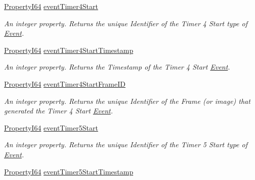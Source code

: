 \begin{DoxyCompactItemize}
\hyperlink{group___common_interface_ga81749b2696755513663492664a18a893}{Property\+I64} \hyperlink{classmv_i_m_p_a_c_t_1_1acquire_1_1_gen_i_cam_1_1_event_control_a8413023934f6bdc2cff4c58c08c5b309}{event\+Timer4\+Start}
\begin{DoxyCompactList}\small\item\em An integer property. Returns the unique Identifier of the Timer 4 Start type of \hyperlink{classmv_i_m_p_a_c_t_1_1acquire_1_1_event}{Event}. \end{DoxyCompactList}\item 
\hyperlink{group___common_interface_ga81749b2696755513663492664a18a893}{Property\+I64} \hyperlink{classmv_i_m_p_a_c_t_1_1acquire_1_1_gen_i_cam_1_1_event_control_a4e09e54ffd2a45b69c95c6ae23944fdb}{event\+Timer4\+Start\+Timestamp}
\begin{DoxyCompactList}\small\item\em An integer property. Returns the Timestamp of the Timer 4 Start \hyperlink{classmv_i_m_p_a_c_t_1_1acquire_1_1_event}{Event}. \end{DoxyCompactList}\item 
\hyperlink{group___common_interface_ga81749b2696755513663492664a18a893}{Property\+I64} \hyperlink{classmv_i_m_p_a_c_t_1_1acquire_1_1_gen_i_cam_1_1_event_control_aa9c6d56c1ad9fbab414034a81a0d0ad5}{event\+Timer4\+Start\+Frame\+I\+D}
\begin{DoxyCompactList}\small\item\em An integer property. Returns the unique Identifier of the Frame (or image) that generated the Timer 4 Start \hyperlink{classmv_i_m_p_a_c_t_1_1acquire_1_1_event}{Event}. \end{DoxyCompactList}\item 
\hyperlink{group___common_interface_ga81749b2696755513663492664a18a893}{Property\+I64} \hyperlink{classmv_i_m_p_a_c_t_1_1acquire_1_1_gen_i_cam_1_1_event_control_a0606bebea03d1c1f706daa8321671b6f}{event\+Timer5\+Start}
\begin{DoxyCompactList}\small\item\em An integer property. Returns the unique Identifier of the Timer 5 Start type of \hyperlink{classmv_i_m_p_a_c_t_1_1acquire_1_1_event}{Event}. \end{DoxyCompactList}\item 
\hyperlink{group___common_interface_ga81749b2696755513663492664a18a893}{Property\+I64} \hyperlink{classmv_i_m_p_a_c_t_1_1acquire_1_1_gen_i_cam_1_1_event_control_ad451a75efbf561375f24d1dbe61f9414}{event\+Timer5\+Start\+Timestamp}

\end{DoxyCompactItemize}
